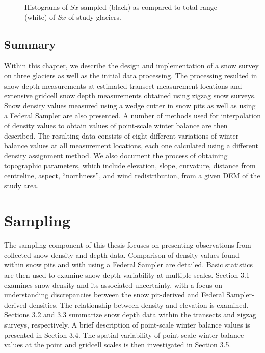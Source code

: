 \documentclass{sfuthesis}
\begin{document}
\begin{figure}[H]
	\caption{Histograms of $Sx$ sampled (black) as compared to total range (white) of $Sx$ of study glaciers.}
	\label{sampledRange:Sx}
\end{figure}


\section{Summary}

Within this chapter, we describe the design and implementation of a snow survey on three glaciers as well as the initial data processing. The processing resulted in snow depth measurements at estimated transect measurement locations and extensive gridcell snow depth measurements obtained using zigzag snow surveys. Snow density values measured using a wedge cutter in snow pits as well as using a Federal Sampler are also presented. A number of methods used for interpolation of density values to obtain values of point-scale winter balance are then described. The resulting data consists of eight different variations of winter balance values at all measurement locations, each one calculated using a different density assignment method. We also document the process of obtaining topographic parameters, which include elevation, slope, curvature, distance from centreline, aspect, ``northness'', and wind redistribution, from a given DEM of the study area.




\chapter{Sampling}

The sampling component of this thesis focuses on presenting observations from collected snow density and depth data. Comparison of density values found within snow pits and with using a Federal Sampler are detailed. Basic statistics are then used to examine snow depth variability at multiple scales.  Section 3.1 examines snow density and its associated uncertainty, with a focus on understanding discrepancies between the snow pit-derived and Federal Sampler-derived densities. The relationship between density and elevation is examined. Sections 3.2 and 3.3 summarize snow depth data within the transects and zigzag surveys, respectively. A brief description of point-scale winter balance values is presented in Section 3.4. The spatial variability of point-scale winter balance values at the point and gridcell scales is then investigated in Section 3.5.
\end{document}
